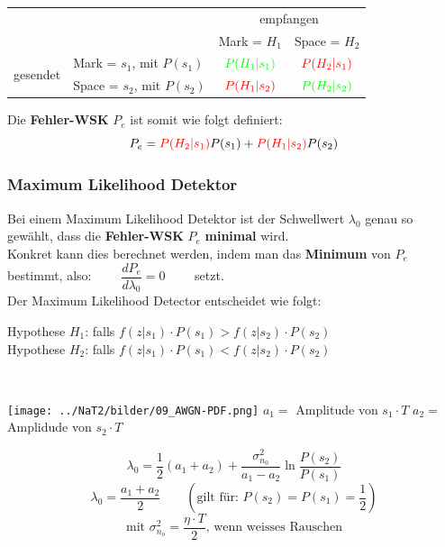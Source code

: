 \begin{minipage}[c]{10cm}
	\begin{center}
	 	\begin{tabular}{l l|c|c|}
	 		\cline{3-4} 
	 			& & \multicolumn{2}{c|}{empfangen} \\
			\cline{3-4}
				& & Mark = $H_1$ & Space = $H_2$ \\
			\hline
				 \multicolumn{1}{|l|}{\multirow{2}{*}{  gesendet }} 
				 & Mark = $s_1$, mit $P(s_1)$ & $\textcolor{green}{P(H_1 | s_1)}$ 
				 &  $\textcolor{red}{P(H_2 | s_1)}$\\
			\cline{2-4}
				\multicolumn{1}{|l|}{} & Space = $s_2$, mit $P(s_2)$ & $\textcolor{red}{P(H_1 | s_2)}$ 
				& $\textcolor{green}{P(H_2 | s_2)}$ \\
			\hline
		\end{tabular}  
  	\end{center}
\end{minipage}
\begin{minipage}[c]{8cm}
	Die \textbf{Fehler-WSK} $P_e$ ist somit wie folgt definiert:
	$$ P_e = \textcolor{red}{P(H_2 | s_1)} P(s_1) + \textcolor{red}{P(H_1 | s_2)}
	P(s_2)$$
\end{minipage} 

\subsubsection{Maximum Likelihood Detektor }
Bei einem Maximum Likelihood Detektor ist der Schwellwert $\lambda_0$ genau so gewählt, dass die
\textbf{Fehler-WSK }$P_e$ \textbf{minimal} wird. \\
Konkret kann dies berechnet werden, indem man das \textbf{Minimum} von $P_e$ bestimmt, also: $\qquad
\dfrac{d P_e}{d \lambda_0} = 0 \qquad$ setzt. \\ 
Der Maximum Likelihood Detector entscheidet wie folgt: \qquad \parbox[c]{9cm}{Hypothese $H_1$: \quad falls $f(z|s_1)\cdot P(s_1) > f(z|s_2)\cdot P(s_2)$\\
Hypothese $H_2$: \quad falls $f(z|s_1)\cdot P(s_1) < f(z|s_2)\cdot P(s_2)$}\\

\begin{minipage}[c]{9.5cm}
 	\texttt{[image: ../NaT2/bilder/09\_AWGN-PDF.png]} \newline
 	$a_1 = $ Amplitude von $s_1 \cdot T$ \newline
 	$a_2 = $ Amplidude von $s_2 \cdot T$
\end{minipage}
\begin{minipage}[c]{7cm}
	 $$ \lambda_0 = \dfrac{1}{2} (a_1 + a_2) + \dfrac{\sigma_{n_0}^2}{a_1 - a_2}
 \ln\dfrac{P(s_2)}{P(s_1)} $$ 
 	$$ \lambda_0 = \dfrac{a_1 + a_2}{2} \qquad (\text{gilt für: } P(s_2) = P(s_1) = \dfrac{1}{2})
 	$$
 	$$ \text{mit } \sigma_{n_o}^2 = \frac{\eta \cdot T}{2}\text{, wenn weisses Rauschen}$$
\end{minipage} 

